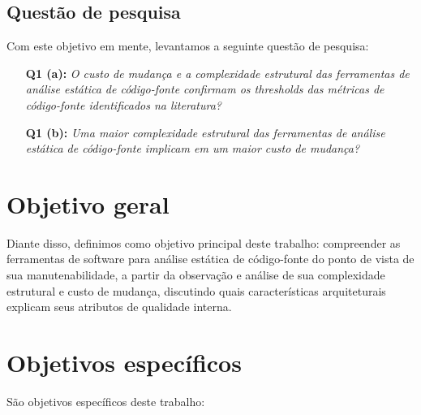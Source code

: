\subsection{Questão de pesquisa}

Com este objetivo em mente, levantamos a seguinte questão de pesquisa:

\begin{enumerate}
  \item [{\bf Q1 (a):}] {\em O custo de mudança e a complexidade
  estrutural das ferramentas de análise estática de código-fonte confirmam os
  thresholds das métricas de código-fonte identificados na literatura?}

  \item [{\bf Q1 (b):}] {\em Uma maior complexidade estrutural das
  ferramentas de análise estática de código-fonte implicam em um maior custo de
  mudança?}
\end{enumerate}

\section{Objetivo geral}

Diante disso, definimos como objetivo principal deste trabalho: compreender
as ferramentas de software para análise estática de código-fonte do ponto de
vista de sua manutenabilidade, a partir da observação e análise de sua complexidade
estrutural e custo de mudança, discutindo quais características arquiteturais
explicam seus atributos de qualidade interna.

\section{Objetivos específicos}

São objetivos específicos deste trabalho:

